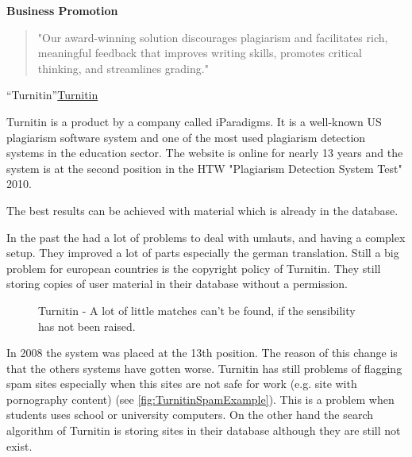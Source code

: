 \textbf{Business Promotion}
\begin{quote}
"Our award-winning solution discourages plagiarism and facilitates rich, meaningful feedback that improves writing skills, promotes critical thinking, and streamlines grading."
\end{quote}
\enquote{Turnitin}\citep{Turnitin Business Promotion}\href{http://www.turnitin.com}{Turnitin}


Turnitin is a product by a company called iParadigms. It is a well-known US plagiarism software system and one of the most used plagiarism detection systems in the education sector. The website is online for nearly 13 years and the system is at the second position in the HTW "Plagiarism Detection System Test" 2010.  

The best results can be achieved with material which is already in the database. 

In the past the had a lot of problems to deal with umlauts, and having a complex setup. They improved a lot of parts especially the german translation. Still a big problem for european countries is the copyright policy of Turnitin. They still storing copies of user material in their database without a permission. \citep{TurnitinTest}

 \begin{figure}[!h]
  \centering
  \caption{Turnitin - A lot of little matches can't be found, if the sensibility has not been raised.}
  \label{fig:Turnitin overview}
\end{figure}
 
In 2008 the system was placed at the 13th position. The reason of this change is that the others systems have gotten worse. Turnitin has still problems of flagging spam sites especially when this sites are not safe for work (e.g. site with pornography content) (see \ref{fig:TurnitinSpamExample}). This is a problem when students uses school or university computers.
On the other hand the search algorithm of Turnitin is storing sites in their database although they are still not exist.\citep{TurnitinTest}


